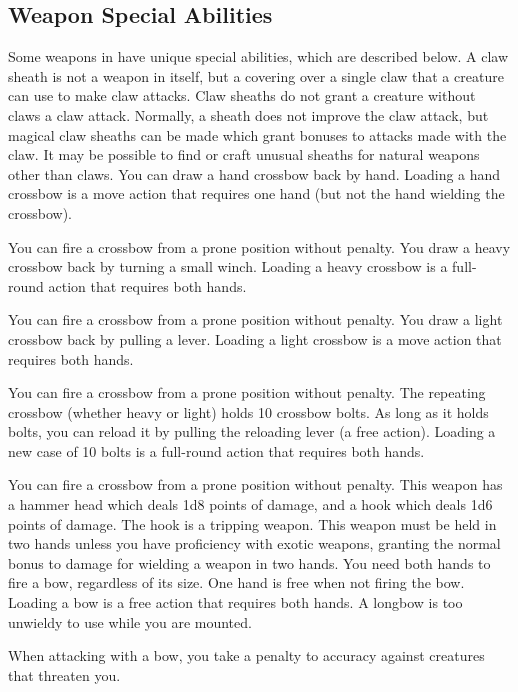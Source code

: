 \subsection{Weapon Special Abilities}
Some weapons in  have unique special abilities, which are described below.
 A claw sheath is not a weapon in itself, but a covering over a single claw that a creature can use to make claw attacks. Claw sheaths do not grant a creature without claws a claw attack. Normally, a sheath does not improve the claw attack, but magical claw sheaths can be made which grant bonuses to attacks made with the claw. It may be possible to find or craft unusual sheaths for natural weapons other than claws.
 You can draw a hand crossbow back by hand. Loading a hand crossbow is a move action that requires one hand (but not the hand wielding the crossbow).
\par You can fire a crossbow from a prone position without penalty.
 You draw a heavy crossbow back by turning a small winch. Loading a heavy crossbow is a full-round action that requires both hands.
\par You can fire a crossbow from a prone position without penalty.
 You draw a light crossbow back by pulling a lever. Loading a light crossbow is a move action that requires both hands.
\par You can fire a crossbow from a prone position without penalty.
 The repeating crossbow (whether heavy or light) holds 10 crossbow bolts. As long as it holds bolts, you can reload it by pulling the reloading lever (a free action). Loading a new case of 10 bolts is a full-round action that requires both hands.
\par You can fire a crossbow from a prone position without penalty.
 This weapon has a hammer head which deals 1d8 points of damage, and a hook which deals 1d6 points of damage. The hook is a tripping weapon.
 This weapon must be held in two hands unless you have proficiency with exotic weapons, granting the normal  bonus to damage for wielding a weapon in two hands.
 You need both hands to fire a bow, regardless of its size. One hand is free when not firing the bow. Loading a bow is a free action that requires both hands. A longbow is too unwieldy to use while you are mounted.
\par When attacking with a bow, you take a  penalty to accuracy against creatures that threaten you.
